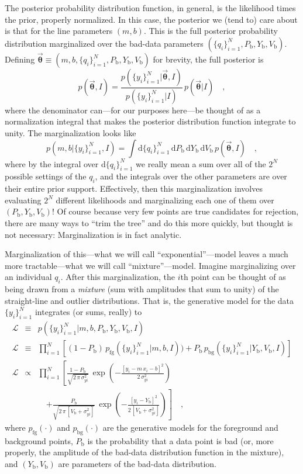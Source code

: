 \documentclass[12pt,twoside]{article}
\newcommand{\mmatrix}[1]{\boldsymbol{#1}}
\newcommand{\parametervector}[1]{\mmatrix{\vec{#1}}}
\newcommand{\pvtheta}{\parametervector{\theta}}
\newcommand{\setofall}[3]{\{{#1}\}_{{#2}}^{{#3}}}
\newcommand{\allq}{\setofall{q_i}{i=1}{N}}
\newcommand{\ally}{\setofall{y_i}{i=1}{N}}
\renewcommand{\d}{\mathrm{d}}
\newcommand{\like}{\mathscr{L}}
\newcommand{\pfg}{p_{\mathrm{fg}}}
\newcommand{\pbg}{p_{\mathrm{bg}}}
\newcommand{\Pbad}{P_{\mathrm{b}}}
\newcommand{\Ybad}{Y_{\mathrm{b}}}
\newcommand{\Vbad}{V_{\mathrm{b}}}
\begin{document}
The posterior probability distribution function, in general, is the
likelihood times the prior, properly normalized.  In this case, the
posterior we (tend to) care about is that for the line parameters
$(m,b)$.  This is the full posterior probability distribution
marginalized over the bad-data parameters $(\allq,\Pbad,\Ybad,\Vbad)$.
Defining $\pvtheta\equiv(m,b,\allq,\Pbad,\Ybad,\Vbad)$ for brevity, the
full posterior is
\begin{equation}
p(\pvtheta,I) =
 \frac{p(\ally|\pvtheta,I)}{p(\ally|I)}
 \,p(\pvtheta|I)
 \quad,
\end{equation}
where the denominator can---for our purposes here---be thought of as a
normalization integral that makes the posterior distribution function
integrate to unity.  The marginalization looks like
\begin{equation}
p(m,b|\ally,I)=\int \d\allq\,\d\Pbad\,\d\Ybad\,\d\Vbad
 \,p(\pvtheta,I) \quad,
\end{equation}
where by the integral over $\d\allq$ we really mean a sum over all of
the $2^N$ possible settings of the $q_i$, and the integrals over the
other parameters are over their entire prior support.  Effectively,
then this marginalization involves evaluating $2^N$ different
likelihoods and marginalizing each one of them over
$(\Pbad,\Ybad,\Vbad)$!  Of course because very few points are true
candidates for rejection, there are many ways to ``trim the tree'' and
do this more quickly, but thought is not necessary: Marginalization is
in fact analytic.

Marginalization of this---what we will call ``exponential''---model
leaves a much more tractable---what we will call ``mixture''---model.
Imagine marginalizing over an individual $q_i$.  After this
marginalization, the $i$th point can be thought of as being drawn from
a \emph{mixture} (sum with amplitudes that sum to unity) of the
straight-line and outlier distributions.  That is, the generative
model for the data $\ally$ integrates (or sums, really) to
\begin{eqnarray}\label{eq:mixture}\displaystyle
\like &\equiv& p(\ally|m,b,\Pbad,\Ybad,\Vbad,I)
 \nonumber\\
\like &\equiv& \prod_{i=1}^N
 \left[ (1-\Pbad)\,\pfg(\ally|m,b,I))
 + \Pbad\,\pbg(\ally|\Ybad,\Vbad,I) \right]
 \nonumber\\
\like &\propto&
 \prod_{i=1}^N \left[\frac{1-\Pbad}{\sqrt{2\,\pi\,\sigma_{yi}^2}}
 \,\exp\left(-\frac{[y_i-m\,x_i-b]^2}{2\,\sigma_{yi}^2}\right)\right.
 \nonumber \\ & & \quad
 \left.+ \frac{\Pbad}{\sqrt{2\,\pi\,[\Vbad+\sigma_{yi}^2]}}
 \,\exp\left(-\frac{[y_i-\Ybad]^2}{2\,[\Vbad+\sigma_{yi}^2]}\right)\right]
 \quad ,
\end{eqnarray}
where $\pfg(\cdot)$ and $\pbg(\cdot)$ are the generative models for
the foreground and background points, $\Pbad$ is the probability that
a data point is bad (or, more properly, the amplitude of the bad-data
distribution function in the mixture), and $(\Ybad,\Vbad)$ are
parameters of the bad-data distribution.
\end{document}
